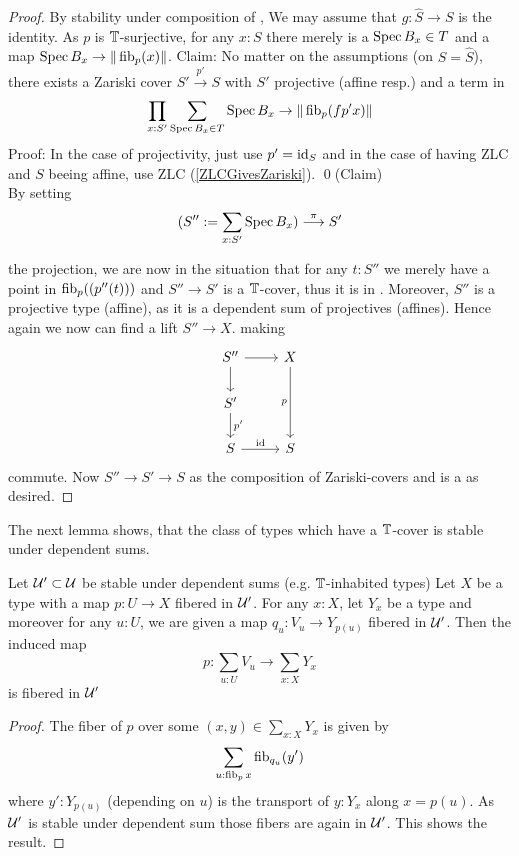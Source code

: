 \begin{proof}
	By stability under composition of \Cov, We may assume that $g : \hat{S} \to S$ is the identity.
	As $p$ is $\mathbb{T}$-surjective, for any $x : S$ there merely is a $\operatorname{Spec} B_x \in T$  and a map $\operatorname{Spec} B_x \to \| \operatorname{fib}_p (x) \| $. 
	Claim: No matter on the assumptions (on $S = \hat{S}$), there exists a Zariski cover $S' \overset{p'}{\to} S$ with $S'$ projective (affine resp.) and a term in
	\[\prod_{x : S'} \sum_{\operatorname{Spec} B_x \in T} \operatorname{Spec} B_x \to \| \operatorname{fib}_p (fp' x)\| \]
	Proof: In the case of projectivity, just use $p' = \operatorname{id}_S$ and in the case of having ZLC and $S$ beeing affine, use ZLC (\ref{ZLCGivesZariski}). \qed(Claim)\\    
	By setting 
	\[(S'' := \sum_{x : S'} \operatorname{Spec} B_x) \overset{\pi}{\longrightarrow} S' \]
	
	the projection, we are now in the situation that for any $t : S''$ we merely have a point in $\operatorname{fib}_p((p''(t)))$ and $S'' \to S'$ is a $\mathbb{T}$-cover, thus it is in \Cov. Moreover, $S''$ is a projective type (affine), as it is a dependent sum of projectives (affines). Hence again we now can find a lift $S'' \to X$. %
	making
	\[\begin{tikzcd}
		{S''} & X \\
		{S'} \\
		S & S
		\arrow[from=1-1, to=1-2]
		\arrow[from=1-1, to=2-1]
		\arrow["p"', from=1-2, to=3-2]
		\arrow["{p'}", from=2-1, to=3-1]
		\arrow["\id", from=3-1, to=3-2]
	\end{tikzcd}\]
	commute. Now $S'' \to S' \to S$ as the composition of Zariski-covers and \Cover is a \Cover \details as desired.
\end{proof}
The next lemma shows, that the class of types which have a $\mathbb{T}$-cover is stable under dependent sums.
\begin{lemma}{\label{lemma:AtlasSum}}
	Let $\mathcal{U}' \subset \mathcal{U}$ be stable under dependent sums (e.g. $\mathbb{T}$-inhabited types)
	Let $X$ be a type with a  map $p : U \to X$ fibered in $\mathcal{U}'$.  For any $x : X$, let $Y_x$ be a type and moreover for any $u : U$, we are given a map $q_u : V_u \to Y_{p(u)}$ fibered in $\mathcal{U}'$. Then the induced map
	\[
	p : \sum_{u : U} V_u \to \sum_{x : X} Y_{x}
	\]
	is fibered in $\mathcal{U}'$
\end{lemma}
\begin{proof}
	The fiber of $p$ over some $(x,y) \in \sum_{x :X} Y_x$ is given by
	\[
	\sum_{u : \operatorname{fib}_p x} \operatorname{fib}_{q_u} (y') 
	\]
	where $y' : Y_{p(u)}$ (depending on $u$) is the transport of $y : Y_x$ along $x = p(u)$. As $\mathcal{U}'$ is stable under dependent sum %
	those fibers are again in $\mathcal{U}'$. This shows the result.
\end{proof}
